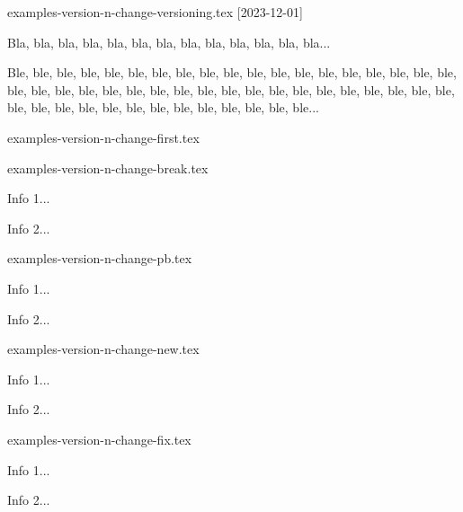 \begin{filecontents*}[overwrite]{examples-version-n-change-versioning.tex}
[2023-12-01]

Bla, bla, bla, bla, bla, bla, bla, bla, bla, bla, bla, bla, bla...

\bigskip %


Ble, ble, ble, ble, ble, ble, ble, ble, ble, ble, ble, ble, ble,
ble, ble, ble, ble, ble, ble, ble, ble, ble, ble, ble, ble, ble,
ble, ble, ble, ble, ble, ble, ble, ble, ble, ble, ble, ble, ble,
ble, ble, ble, ble, ble, ble, ble, ble, ble, ble, ble, ble...
\end{filecontents*}


\begin{filecontents*}[overwrite]{examples-version-n-change-first.tex}
\end{filecontents*}


\begin{filecontents*}[overwrite]{examples-version-n-change-break.tex}
\begin{tdocbreak}
    \item Info 1...
    \item Info 2...
\end{tdocbreak}
\end{filecontents*}


\begin{filecontents*}[overwrite]{examples-version-n-change-pb.tex}
\begin{tdocprob}
    \item Info 1...
    \item Info 2...
\end{tdocprob}
\end{filecontents*}


\begin{filecontents*}[overwrite]{examples-version-n-change-new.tex}
\begin{tdocnew}
    \item Info 1...
    \item Info 2...
\end{tdocnew}
\end{filecontents*}


\begin{filecontents*}[overwrite]{examples-version-n-change-fix.tex}
\begin{tdocfix}
    \item Info 1...
    \item Info 2...
\end{tdocfix}
\end{filecontents*}



